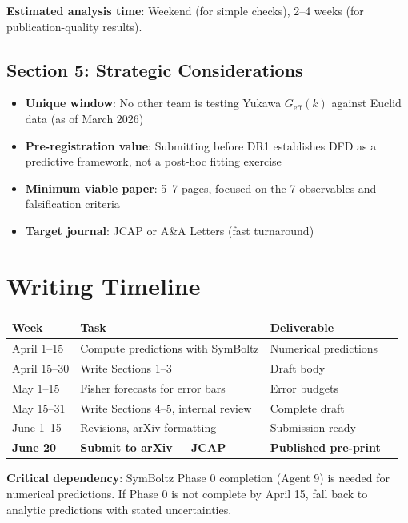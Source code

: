 \documentclass[11pt,a4paper]{article}
\begin{document}
\textbf{Estimated analysis time}: Weekend (for simple checks), 2--4 weeks (for publication-quality results).

\subsection{Section 5: Strategic Considerations}

\begin{itemize}
\item \textbf{Unique window}: No other team is testing Yukawa $G_{\mathrm{eff}}(k)$ against Euclid data (as of March 2026)
\item \textbf{Pre-registration value}: Submitting before DR1 establishes DFD as a predictive framework, not a post-hoc fitting exercise
\item \textbf{Minimum viable paper}: 5--7 pages, focused on the 7 observables and falsification criteria
\item \textbf{Target journal}: JCAP or A\&A Letters (fast turnaround)
\end{itemize}

\section{Writing Timeline}

\begin{center}
\begin{tabular}{llll}
\toprule
\textbf{Week} & \textbf{Task} & \textbf{Deliverable} \\
\midrule
April 1--15 & Compute predictions with SymBoltz & Numerical predictions \\
April 15--30 & Write Sections 1--3 & Draft body \\
May 1--15 & Fisher forecasts for error bars & Error budgets \\
May 15--31 & Write Sections 4--5, internal review & Complete draft \\
June 1--15 & Revisions, arXiv formatting & Submission-ready \\
\textbf{June 20} & \textbf{Submit to arXiv + JCAP} & \textbf{Published pre-print} \\
\bottomrule
\end{tabular}
\end{center}

\textbf{Critical dependency}: SymBoltz Phase 0 completion (Agent 9) is needed for numerical predictions. If Phase 0 is not complete by April 15, fall back to analytic predictions with stated uncertainties.
\end{document}
